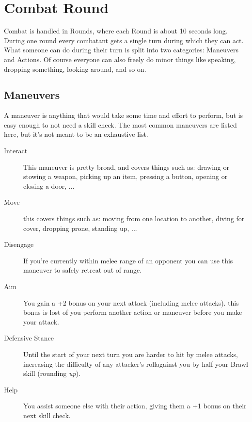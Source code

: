 \section{Combat Round}
Combat is handled in Rounds, where each Round is about 10 seconds long.
During one round every combatant gets a single turn during which they can act.
What someone can do during their turn is split into two categories: Maneuvers and Actions.
Of course everyone can also freely do minor things like speaking, dropping something, looking around, and so on. 

\subsection{Maneuvers}
A maneuver is anything that would take some time and effort to perform, but is easy enough to not need a skill check. 
The most common maneuvers are listed here, but it's not meant to be an exhaustive list.

\begin{multicols}{2}
    \begin{description}
        \item[Interact]%
        This maneuver is pretty broad, and covers things such as: drawing or stowing a weapon, picking up an item, pressing a button, opening or closing a door, ...

        \item[Move] this covers things such as: moving from one location to another, diving for cover, dropping prone, standing up, ...

        \item[Disengage] 
        If you're currently within melee range of an opponent you can use this maneuver to safely retreat out of range.

        \item[Aim]
        You gain a +2 bonus on your next attack (including melee attacks).
        this bonus is lost of you perform another action or maneuver before you make your attack.
        
        \item[Defensive Stance] 
        Until the start of your next turn you are harder to hit by melee attacks, increasing the difficulty of any attacker's rollagainst you by half your Brawl skill (rounding \textit{up}).
        
        \item[Help] 
        You assist someone else with their action, giving them a +1 bonus on their next skill check.
    \end{description}
\end{multicols}

